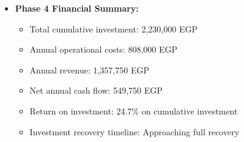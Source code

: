 \begin{itemize}
    \item \textbf{Phase 4 Financial Summary:}
    \begin{itemize}
        \item Total cumulative investment: 2,230,000 EGP
        \item Annual operational costs: 808,000 EGP
        \item Annual revenue: 1,357,750 EGP
        \item Net annual cash flow: 549,750 EGP
        \item Return on investment: 24.7\% on cumulative investment
        \item Investment recovery timeline: Approaching full recovery
    \end{itemize}
\end{itemize}

